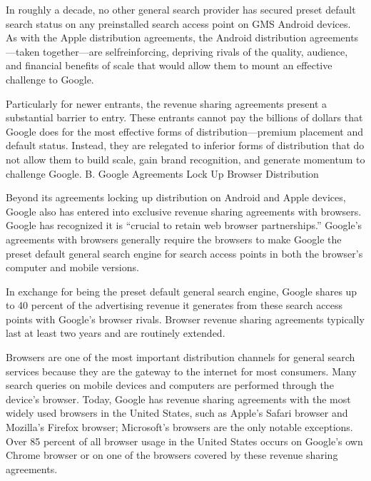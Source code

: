 \documentclass[11pt,b5paper]{scrartcl}
\begin{document}

In roughly a decade, no other general search provider has secured preset default
search status on any preinstalled search access point on GMS Android devices. As with the
Apple distribution agreements, the Android distribution agreements—taken together—are selfreinforcing, depriving rivals of the quality, audience, and financial benefits of scale that would
allow them to mount an effective challenge to Google.


Particularly for newer entrants, the revenue sharing agreements present a
substantial barrier to entry. These entrants cannot pay the billions of dollars that Google does for
the most effective forms of distribution—premium placement and default status. Instead, they are
relegated to inferior forms of distribution that do not allow them to build scale, gain brand
recognition, and generate momentum to challenge Google.
B.
Google Agreements Lock Up Browser Distribution


Beyond its agreements locking up distribution on Android and Apple devices,
Google also has entered into exclusive revenue sharing agreements with browsers. Google has
recognized it is “crucial to retain web browser partnerships.” Google’s agreements with browsers
generally require the browsers to make Google the preset default general search engine for
search access points in both the browser’s computer and mobile versions.


In exchange for being the preset default general search engine, Google shares up
to 40 percent of the advertising revenue it generates from these search access points with
Google’s browser rivals. Browser revenue sharing agreements typically last at least two years
and are routinely extended.


Browsers are one of the most important distribution channels for general search
services because they are the gateway to the internet for most consumers. Many search queries
on mobile devices and computers are performed through the device’s browser. Today, Google
has revenue sharing agreements with the most widely used browsers in the United States, such as
Apple’s Safari browser and Mozilla’s Firefox browser; Microsoft’s browsers are the only notable
exceptions. Over 85 percent of all browser usage in the United States occurs on Google’s own
Chrome browser or on one of the browsers covered by these revenue sharing agreements.
\end{document}
